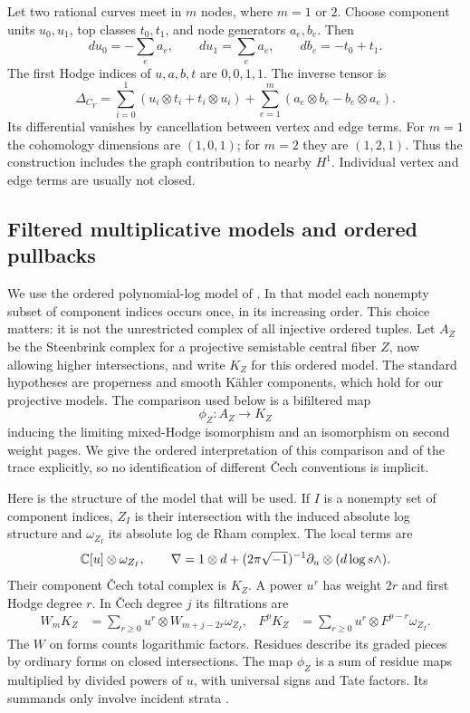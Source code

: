 \begin{example}\label{fp:curve-example}
Let two rational curves meet in $m$ nodes, where $m=1$ or $2$.  Choose component
units $u_0,u_1$, top classes $t_0,t_1$, and node generators $a_e,b_e$.
Then
\[
 du_0=-\sum_ea_e,\qquad du_1=\sum_ea_e,\qquad
 db_e=-t_0+t_1.
\]
The first Hodge indices of $u,a,b,t$ are $0,0,1,1$.  The inverse tensor is
\[
 \Delta_{C_Y}=\sum_{i=0}^1(u_i\otimes t_i+t_i\otimes u_i)
          +\sum_{e=1}^m(a_e\otimes b_e-b_e\otimes a_e).
\]
Its differential vanishes by cancellation between vertex and edge terms.
For $m=1$ the cohomology dimensions are $(1,0,1)$; for $m=2$ they are
$(1,2,1)$.  Thus the construction includes the graph contribution to nearby
$H^1$.  Individual vertex and edge terms are usually not closed.
\end{example}

\subsection{Filtered multiplicative models and ordered pullbacks}

We use the ordered polynomial-log model of
\cite[Sections~4.14--4.19 and~5.4, Proposition~5.8]{Fujisawa2008}.
In that model each nonempty subset of component indices occurs once, in its
increasing order.  This choice matters: it is not the unrestricted complex
of all injective ordered tuples.  Let $A_Z$ be the Steenbrink complex for a
projective semistable central fiber $Z$, now allowing higher intersections,
and write $K_Z$ for this ordered model.  The standard hypotheses are
properness and smooth K\"ahler components, which hold for our projective
models.  The comparison used below is a bifiltered map
\begin{equation}\label{fp:comparison}
 \phi_Z:A_Z\longrightarrow K_Z
\end{equation}
inducing the limiting mixed-Hodge isomorphism and an isomorphism on second
weight pages.  We give the ordered interpretation of this comparison and
of the trace explicitly, so no identification of different \v{C}ech
conventions is implicit.

Here is the structure of the model that will be used.  If $I$ is a nonempty
set of component indices, $Z_I$ is their intersection with the induced
absolute log structure and $\omega_{Z_I}$ its absolute log de Rham complex.
The local terms are
\[
 \mathbb C[u]\otimes\omega_{Z_I},\qquad
 \nabla=1\otimes d+(2\pi\sqrt{-1})^{-1}
                      \partial_u\otimes(d\log s\wedge).
\]
Their component \v{C}ech total complex is $K_Z$.  A power $u^r$ has weight
$2r$ and first Hodge degree $r$.  In \v{C}ech degree $j$ its filtrations are
\begin{align}\label{fp:k-filtrations}
 W_m K_Z&=\sum_{r\geq0}u^r\otimes W_{m+j-2r}\omega_{Z_I},&
 F^pK_Z&=\sum_{r\geq0}u^r\otimes F^{p-r}\omega_{Z_I}.
\end{align}
The $W$ on forms counts logarithmic factors.  Residues describe its graded
pieces by ordinary forms on closed intersections.  The map $\phi_Z$ is a sum
of residue maps multiplied by divided powers of $u$, with universal signs
and Tate factors.  Its summands only involve incident strata
\cite[Definition~5.24 and Lemma~5.25]{Fujisawa2014}.

